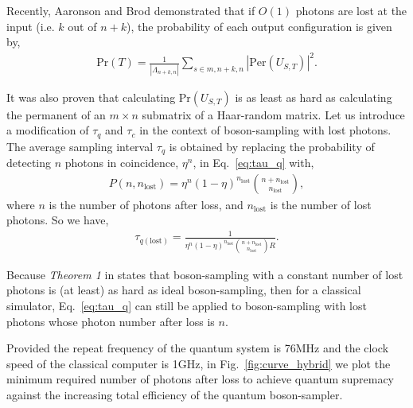 \documentclass[aps,rmp,twocolumn,amsmath,amssymb,nofootinbib,superscriptaddress]{revtex4}
\newcommand{\comment}[1]{{\color{blue}{#1}}}
\begin{document}
Recently, Aaronson and Brod \cite{bib:33} demonstrated that if $O(1)$ photons are lost at the input (i.e. $k$ out of \mbox{$n+k$}), the probability of each output configuration is given by,
\begin{align}
\mathrm{Pr}(T) = \frac{1}{|\Lambda_{n+k,n}|} \sum_{s\in m,n+k,n} |\mathrm{Per}(U_{S,T})|^2.
\end{align}
\comment{Need to define $\Lambda$ and meaning of $s\in m,n+k,n$.}

It was also proven that calculating $\mathrm{Pr}(U_{S,T})$ is as least as hard as calculating the permanent of an \mbox{$m\times n$} submatrix of a Haar-random matrix. Let us introduce a modification of $\tau_q$ and $\tau_c$ in the context of boson-sampling with lost photons. The average sampling interval $\tau_q$ is obtained by replacing the probability of detecting $n$ photons in coincidence, $\eta^n$, in Eq.~\ref{eq:tau_q} with,
\begin{align}
P(n,n_\mathrm{lost}) = \eta^n(1-\eta)^{n_\mathrm{lost}}\binom{n+n_\mathrm{lost}}{n_\mathrm{lost}},
\end{align}
where $n$ is the number of photons after loss, and $n_\mathrm{lost}$ is the number of lost photons. So we have,
\begin{align}
\tau_{q(\mathrm{lost})} = \frac{1}{\eta^n(1-\eta)^{n_\mathrm{lost}}\binom{n+n_
\mathrm{lost}}{n_\mathrm{lost}}R}.
\end{align}

Because \emph{Theorem 1} in \cite{bib:33} states that boson-sampling with a constant number of lost photons is (at least) as hard as ideal boson-sampling, then for a classical simulator, Eq.~\ref{eq:tau_q} can still be applied to boson-sampling with lost photons whose photon number after loss is $n$.

Provided the repeat frequency of the quantum system is 76MHz and the clock speed of the classical computer is 1GHz, in Fig.~\ref{fig:curve_hybrid} we plot the minimum required number of photons after loss to achieve quantum supremacy against the increasing total efficiency of the quantum boson-sampler.
\end{document}
